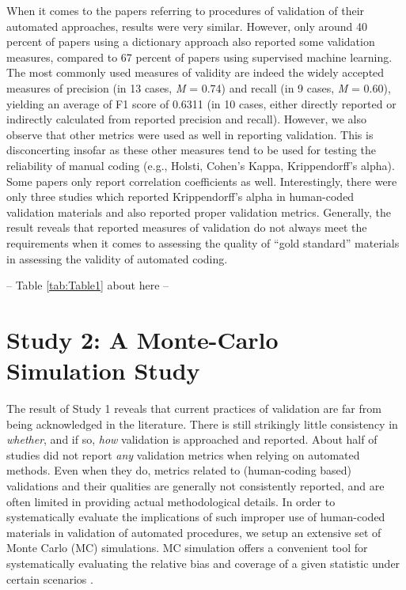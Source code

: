 \documentclass[man, 12pt, a4paper, nolmodern, noextraspace]{apa6}
\begin{document}
    When it comes to the papers referring to procedures of validation of their automated approaches, results were very similar. However, only around 40 percent of papers using a dictionary approach also reported some validation measures, compared to 67 percent of papers using supervised machine learning. The most commonly used measures of validity are indeed the widely accepted measures of precision (in 13 cases, \textit{M} = 0.74) and recall (in 9 cases, \textit{M} = 0.60), yielding an average of F1 score of 0.6311 (in 10 cases, either directly reported or indirectly calculated from reported precision and recall). However, we also observe that other metrics were used as well in reporting validation. This is disconcerting insofar as these other measures tend to be used for testing the reliability of manual coding (e.g., Holsti, Cohen’s Kappa, Krippendorff’s alpha). Some papers only report correlation coefficients as well. Interestingly, there were only three studies which reported Krippendorff’s alpha in human-coded validation materials and also reported proper validation metrics. Generally, the result reveals that reported measures of validation do not always meet the requirements when it comes to assessing the quality of \enquote{gold standard} materials in assessing the validity of automated coding.
    \centerline{ -- Table \ref{tab:Table1} about here -- }    

\section{Study 2: A Monte-Carlo Simulation Study}
    
    The result of Study 1 reveals that current practices of validation are far from being acknowledged in the literature. There is still strikingly little consistency in \textit{whether}, and if so, \textit{how} validation is approached and reported. About half of studies did not report \textit{any} validation metrics when relying on automated methods. Even when they do, metrics related to (human-coding based) validations and their qualities are generally not consistently reported, and are often limited in providing actual methodological details. In order to systematically evaluate the implications of such improper use of human-coded materials in validation of automated procedures, we setup an extensive set of Monte Carlo (MC) simulations. MC simulation offers a convenient tool for systematically evaluating the relative bias and coverage of a given statistic under certain scenarios \parencites[][]{scharkow2017measurement, leemann2017extending}.
    
\end{document}
